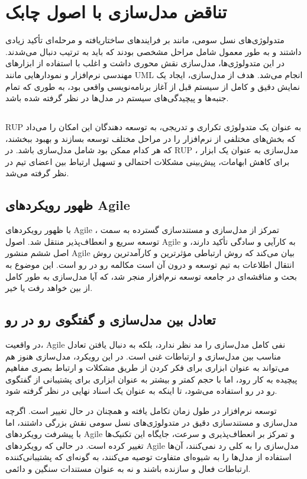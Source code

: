 \section*{تناقض مدل‌سازی با اصول چابک}

متدولوژی‌های نسل سومی، مانند
بر فرایندهای ساختاریافته و مرحله‌ای تأکید زیادی داشتند و به طور معمول شامل مراحل مشخصی بودند که باید به ترتیب دنبال می‌شدند. در این متدولوژی‌ها، مدل‌سازی نقش محوری داشت و اغلب با استفاده از ابزارهای مهندسی نرم‌افزار و نمودارهایی مانند UML انجام می‌شد. هدف از مدل‌سازی، ایجاد یک نمایش دقیق و کامل از سیستم قبل از آغاز برنامه‌نویسی واقعی بود، به طوری که تمام جنبه‌ها و پیچیدگی‌های سیستم در مدل‌ها در نظر گرفته شده باشد.

\subsection*{}
RUP
به عنوان یک متدولوژی تکراری و تدریجی، به توسعه دهندگان این امکان را می‌داد که بخش‌های مختلفی از نرم‌افزار را در مراحل مختلف توسعه بسازند و بهبود ببخشند، که هر کدام ممکن بود شامل مدل‌سازی باشد. در RUP ، مدل‌سازی به عنوان یک ابزار برای کاهش ابهامات، پیش‌بینی مشکلات احتمالی و تسهیل ارتباط بین اعضای تیم در نظر گرفته می‌شد.

\subsection*{ظهور رویکردهای Agile}
با ظهور رویکردهای Agile ، تمرکز از مدل‌سازی و مستندسازی گسترده به سمت توسعه سریع و انعطاف‌پذیر منتقل شد. اصول Agile به کارآیی و سادگی تأکید دارند، و اصل ششم منشور Agile بیان می‌کند که روش ارتباطی مؤثرترین و کارآمدترین روش انتقال اطلاعات به تیم توسعه و درون آن است مکالمه رو در رو است. این موضوع به بحث و مناقشه‌ای در جامعه توسعه نرم‌افزار منجر شد، که آیا مدل‌سازی به طور کامل از بین خواهد رفت یا خیر.

\subsection*{تعادل بین مدل‌سازی و گفتگوی رو در رو}
در واقعیت، Agile نفی کامل مدل‌سازی را مد نظر ندارد، بلکه به دنبال یافتن تعادل مناسب بین مدل‌سازی و ارتباطات غنی است. در این رویکرد، مدل‌سازی هنوز هم می‌تواند به عنوان ابزاری برای فکر کردن از طریق مشکلات و ارتباط بصری مفاهیم پیچیده به کار رود، اما با حجم کمتر و بیشتر به عنوان ابزاری برای پشتیبانی از گفتگوی رو در رو استفاده می‌شود، تا اینکه به عنوان یک اسناد نهایی در نظر گرفته شود.

توسعه نرم‌افزار در طول زمان تکامل یافته و همچنان در حال تغییر است. اگرچه مدل‌سازی و مستندسازی دقیق در متدولوژی‌های نسل سومی نقش بزرگی داشتند، اما با پیشرفت رویکردهای Agile و تمرکز بر انعطاف‌پذیری و سرعت، جایگاه این تکنیک‌ها تغییر کرده است. در حالی که رویکردهای Agile مدل‌سازی را به کلی رد نمی‌کنند، آن‌ها استفاده از مدل‌ها را به شیوه‌ای متفاوت توصیه می‌کنند، به گونه‌ای که پشتیبانی‌کننده ارتباطات فعال و سازنده باشند و نه به عنوان مستندات سنگین و دائمی.
